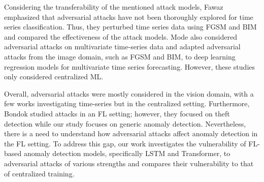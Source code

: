 Considering the transferability of the mentioned attack models, Fawaz \etal \cite{fawaz2019adversarial} emphasized that adversarial attacks have not been thoroughly explored for time series classification. Thus, they perturbed time series data using FGSM and BIM and compared the effectiveness of the attack models. Mode \etal \cite{mode2020adversarial} also considered adversarial attacks on multivariate time-series data and adapted adversarial attacks from the image domain, such as FGSM and BIM, to deep learning regression models for multivariate time series forecasting. However, these studies  \cite{fawaz2019adversarial, mode2020adversarial} only considered centralized ML.  

Overall, adversarial attacks were mostly considered in the vision domain, with a few works investigating time-series \cite{fawaz2019adversarial, mode2020adversarial} but in the centralized setting. Furthermore, Bondok \etal \cite{bondok2023novel} studied attacks in an FL setting; however, they focused on theft detection while our study focuses on generic anomaly detection. Nevertheless, there is a need to understand how adversarial attacks affect anomaly detection in the FL setting. To address this gap, our work investigates the vulnerability of FL-based anomaly detection models, specifically LSTM and Transformer, to adversarial attacks of various strengths and compares their vulnerability to that of centralized training.


